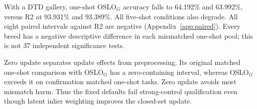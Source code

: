 With a DTD gallery, one-shot OSLO$_G$ accuracy falls to 64.192\% and 63.992\%, versus R2 at 93.931\% and 93.389\%. All five-shot conditions also degrade. All eight paired intervals against R2 are negative (Appendix~\ref{app:paired}). Every breed has a negative descriptive difference in each mismatched one-shot pool; this is not 37 independent significance tests.

Zero update separates update effects from preprocessing. Its original matched one-shot comparison with OSLO$_G$ has a zero-containing interval, whereas OSLO$_G$ exceeds it on confirmation matched one-shot tasks. Zero update avoids most mismatch harm. Thus the fixed defaults fail strong-control qualification even though latent inlier weighting improves the closed-set update.
